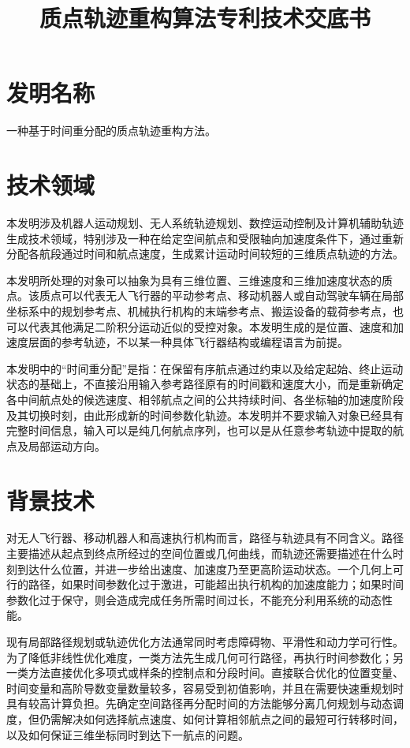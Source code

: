 \documentclass[UTF8,a4paper,12pt,fontset=fandol]{ctexart}
\title{质点轨迹重构算法专利技术交底书}
\author{}
\date{}
\begin{document}
\pagestyle{plain}
\maketitle

\section{发明名称}

一种基于时间重分配的质点轨迹重构方法。

\section{技术领域}

本发明涉及机器人运动规划、无人系统轨迹规划、数控运动控制及计算机辅助轨迹生成技术领域，特别涉及一种在给定空间航点和受限轴向加速度条件下，通过重新分配各航段通过时间和航点速度，生成累计运动时间较短的三维质点轨迹的方法。

本发明所处理的对象可以抽象为具有三维位置、三维速度和三维加速度状态的质点。该质点可以代表无人飞行器的平动参考点、移动机器人或自动驾驶车辆在局部坐标系中的规划参考点、机械执行机构的末端参考点、搬运设备的载荷参考点，也可以代表其他满足二阶积分运动近似的受控对象。本发明生成的是位置、速度和加速度层面的参考轨迹，不以某一种具体飞行器结构或编程语言为前提。

本发明中的“时间重分配”是指：在保留有序航点通过约束以及给定起始、终止运动状态的基础上，不直接沿用输入参考路径原有的时间戳和速度大小，而是重新确定各中间航点处的候选速度、相邻航点之间的公共持续时间、各坐标轴的加速度阶段及其切换时刻，由此形成新的时间参数化轨迹。本发明并不要求输入对象已经具有完整时间信息，输入可以是纯几何航点序列，也可以是从任意参考轨迹中提取的航点及局部运动方向。

\section{背景技术}

对无人飞行器、移动机器人和高速执行机构而言，路径与轨迹具有不同含义。路径主要描述从起点到终点所经过的空间位置或几何曲线，而轨迹还需要描述在什么时刻到达什么位置，并进一步给出速度、加速度乃至更高阶运动状态。一个几何上可行的路径，如果时间参数化过于激进，可能超出执行机构的加速度能力；如果时间参数化过于保守，则会造成完成任务所需时间过长，不能充分利用系统的动态性能。

现有局部路径规划或轨迹优化方法通常同时考虑障碍物、平滑性和动力学可行性。为了降低非线性优化难度，一类方法先生成几何可行路径，再执行时间参数化；另一类方法直接优化多项式或样条的控制点和分段时间。直接联合优化的位置变量、时间变量和高阶导数变量数量较多，容易受到初值影响，并且在需要快速重规划时具有较高计算负担。先确定空间路径再分配时间的方法能够分离几何规划与动态调度，但仍需解决如何选择航点速度、如何计算相邻航点之间的最短可行转移时间，以及如何保证三维坐标同时到达下一航点的问题。
\end{document}

